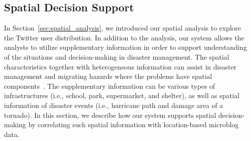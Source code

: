 \subsection{Spatial Decision Support}
\label{sec:spatial_decision_support}
In Section~\ref{sec:spatial_analysis}, we introduced our spatial analysis to explore the Twitter user distribution.
In addition to the analysis, our system allows the analysts to utilize supplementary information in order to support understanding of the situations and decision-making in disaster management.
The spatial characteristics together with heterogeneous information can assist in disaster management and migrating hazards where the problems have spatial components~\cite{Andrienko:2007:GAS}.
The supplementary information can be various types of infrastructures (i.e., school, park, supermarket, and shelter), as well as spatial information of disaster events (i.e., hurricane path and damage area of a tornado).
In this section, we describe how our system supports spatial decision-making by correlating such spatial information with location-based microblog data.

